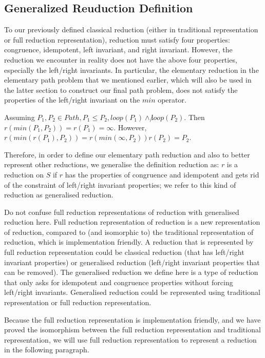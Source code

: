 \documentclass[a4paper,12pt,twoside,openright]{report}
\begin{document}
\subsection{Generalized Reuduction Definition}
To our previously defined classical reduction (either in traditional representation or full reduction representation), reduction must satisfy four properties: congruence, idempotent, left invariant, and right invariant. However, the reduction we encounter in reality does not have the above four properties, especially the left/right invariants. In particular, the elementary reduction in the elementary path problem that we mentioned earlier, which will also be used in the latter section to construct our final path problem, does not satisfy the properties of the left/right invariant on the $min$ operator. 

Assuming $P_1,P_2 \in Path, P_1 \leq P_2, loop(P_1) \wedge \not loop(P_2)$. 
Then $r(min(P_1,P_2)) = r(P_1) = \infty$.
However, $r(min(r(P_1),P_2)) = r(min(\infty,P_2)) r(P_2) = P_2$. 

Therefore, in order to define our elementary path reduction and also to better represent other reductions, we generalise the definition reduction as: $r$ is a reduction on $S$ if $r$ has the properties of congruence and idempotent and gets rid of the constraint of left/right invariant properties; we refer to this kind of reduction as generalised reduction.

Do not confuse full reduction representations of reduction with generalised reduction here. 
Full reduction representation of reduction is a new representation of reduction, compared to (and isomorphic to) the traditional representation of reduction, which is implementation friendly.  A reduction that is represented by full reduction representation could be classical reduction (that has left/right invariant properties) or generalised reduction (left/right invariant properties that can be removed).
The generalised reduction we define here is a type of reduction that only asks for idempotent and congruence properties without forcing left/right invariants.  Generalised reduction could be represented using traditional representation or full reduction representation.

Because the full reduction representation is implementation friendly, and we have proved the isomorphism between the full reduction representation and traditional representation, we will use full reduction representation to represent a reduction in the following paragraph.
\end{document}
